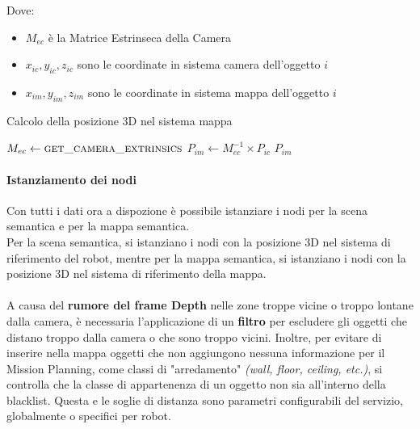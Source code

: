 Dove:
\begin{itemize}
  \item $M_{ec}$ è la Matrice Estrinseca della Camera
  \item $x_{ic}, y_{ic}, z_{ic}$ sono le coordinate in sistema camera dell'oggetto $i$
  \item $x_{im}, y_{im}, z_{im}$ sono le coordinate in sistema mappa dell'oggetto $i$
\end{itemize}

\begin{algorithm}[H]
  \caption{Calcolo della posizione 3D nel sistema mappa}
  \begin{algorithmic}[1]
    \State $M_{ec} \gets \Call{get\_camera\_extrinsics}{}$ 
    \State $P_{im} \gets M_{ec}^{-1} \times P_{ic}$
    \State \Return $P_{im}$
    \EndProcedure
  \end{algorithmic}
\end{algorithm}

\paragraph{Istanziamento dei nodi}
Con tutti i dati ora a dispozione è possibile istanziare i nodi per la scena semantica e per la mappa semantica.\\
Per la scena semantica, si istanziano i nodi con la posizione 3D nel sistema di riferimento del robot, mentre per la mappa semantica, si istanziano i nodi con la posizione 3D nel sistema di riferimento della mappa. \\\\
A causa del \textbf{rumore del frame Depth} nelle zone troppe vicine o troppo lontane dalla camera, è necessaria l'applicazione di un \textbf{filtro} per escludere gli oggetti che distano troppo dalla camera o che sono troppo vicini. Inoltre, per evitare di inserire nella mappa oggetti che non aggiungono nessuna informazione per il Mission Planning, come classi di "arredamento" \textit{(wall, floor, ceiling, etc.)}, si controlla che la classe di appartenenza di un oggetto non sia all'interno della blacklist. Questa e le soglie di distanza sono parametri configurabili del servizio, globalmente o specifici per robot.

